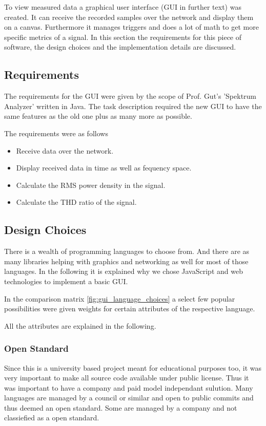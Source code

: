 To view measured data a graphical user interface (GUI in further text) was created. It can receive the recorded samples over the network and display them on a canvas. Furthermore it manages triggers and does a lot of math to get more specific metrics of a signal.
In this section the requirements for this piece of software, the design choices and the implementation details are discussed.

\subsection{Requirements}

The requirements for the GUI were given by the scope of Prof. Gut's 'Spektrum Analyzer' written in Java.
The task description required the new GUI to have the same features as the old one plus as many more as possible.

The requirements were as follows

\begin{itemize}
    \item Receive data over the network.
    \item Display received data in time as well as fequency space.
    \item Calculate the RMS power density in the signal.
    \item Calculate the THD ratio of the signal.
\end{itemize}

\subsection{Design Choices}

There is a wealth of programming languages to choose from. And there are as many libraries helping with graphics and networking as well for most of those languages.
In the following it is explained why we chose JavaScript and web technologies to implement a basic GUI.

In the comparison matrix \ref{fig:gui_language_choices} a select few popular possibilities were given weights for certain attributes of the respective language.

All the attributes are explained in the following.

\subsubsection*{Open Standard} Since this is a university based project meant for educational purposes too, it was very important to make all source code available under public license. Thus it was important to have a company and paid model independant sulution. Many languages are managed by a council or similar and open to public commits and thus deemed an open standard. Some are managed by a company and not classiefied as a open standard.

